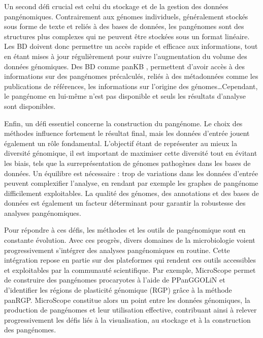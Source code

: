 Un second défi crucial est celui du stockage et de la gestion des données pangénomiques. Contrairement aux génomes individuels, généralement stockés sous forme de texte et reliés à des bases de données, les pangénomes sont des structures plus complexes qui ne peuvent être stockées sous un format linéaire. Les BD doivent donc permettre un accès rapide et efficace aux informations, tout en étant mises à jour régulièrement pour suivre l’augmentation du volume des données génomiques. Des BD comme panKB \cite{sun_pankb_2025}, permettent d'avoir accès à des informations sur des pangénomes précalculés, reliés à des métadonnées comme les publications de références, les informations sur l'origine des génomes\dots Cependant, le pangénome en lui-même n'est pas disponible et seuls les résultats d'analyse sont disponibles.

Enfin, un défi essentiel concerne la construction du pangénome. Le choix des méthodes influence fortement le résultat final, mais les données d’entrée jouent également un rôle fondamental. L’objectif étant de représenter au mieux la diversité génomique, il est important de maximiser cette diversité tout en évitant les biais, tels que la surreprésentation de génomes pathogènes dans les bases de données. Un équilibre est nécessaire : trop de variations dans les données d’entrée peuvent complexifier l’analyse, en rendant par exemple les graphes de pangénome difficilement exploitables. La qualité des génomes, des annotations et des bases de données est également un facteur déterminant pour garantir la robustesse des analyses pangénomiques.

Pour répondre à ces défis, les méthodes et les outils de pangénomique sont en constante évolution. Avec ces progrès, divers domaines de la microbiologie voient progressivement s'intégrer des analyses pangénomiques en routine. Cette intégration repose en partie sur des plateformes qui rendent ces outils accessibles et exploitables par la communauté scientifique. Par exemple, MicroScope\cite{vallenet_microscope_2020} permet de construire des pangénomes procaryotes à l’aide de PPanGGOLiN \cite{gautreau_ppanggolin_2020} et d’identifier les régions de plasticité génomique (RGP) grâce à la méthode panRGP\cite{bazin_panrgp_2020}. MicroScope constitue alors un point entre les données génomiques, la production de pangénomes et leur utilisation effective, contribuant ainsi à relever progressivement les défis liés à la visualisation, au stockage et à la construction des pangénomes.

